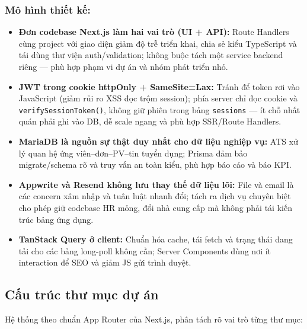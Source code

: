 \subsubsection*{Mô hình thiết kế:}
\begin{itemize}
    \item \textbf{Đơn codebase Next.js làm hai vai trò (UI + API):}
    Route Handlers cùng project với giao diện giảm độ trễ triển khai, chia sẻ kiểu TypeScript và tái dùng thư viện auth/validation; không buộc tách một service backend riêng --- phù hợp phạm vi dự án và nhóm phát triển nhỏ.

    \item \textbf{JWT trong cookie httpOnly + SameSite=Lax:}
    Tránh để token rơi vào JavaScript (giảm rủi ro XSS đọc trộm session); phía server chỉ đọc cookie và \texttt{verifySessionToken()}, không giữ phiên trong bảng \texttt{sessions} --- ít chỗ nhất quán phải ghi vào DB, dễ scale ngang và phù hợp SSR/Route Handlers.

    \item \textbf{MariaDB là nguồn sự thật duy nhất cho dữ liệu nghiệp vụ:}
    ATS xử lý quan hệ ứng viên--đơn--PV--tin tuyển dụng; Prisma đảm bảo migrate/schema rõ và truy vấn an toàn kiểu, phù hợp báo cáo và báo KPI.

    \item \textbf{Appwrite và Resend không lưu thay thế dữ liệu lõi:}
    File và email là các concern xâm nhập và tuân luật nhanh đổi; tách ra dịch vụ chuyên biệt cho phép giữ codebase HR mỏng, đổi nhà cung cấp mà không phải tái kiến trúc bảng ứng dụng.

    \item \textbf{TanStack Query ở client:}
    Chuẩn hóa cache, tái fetch và trạng thái đang tải cho các bảng long-poll không cần; Server Components dùng nơi ít interaction để SEO và giảm JS gửi trình duyệt.

\end{itemize}

\subsection{Cấu trúc thư mục dự án}
Hệ thống theo chuẩn App Router của Next.js, phân tách rõ vai trò từng thư mục:

